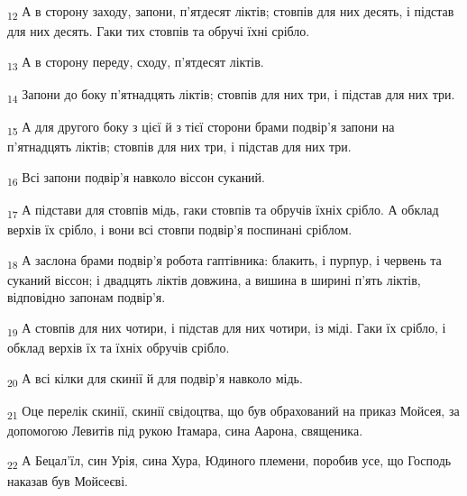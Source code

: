 \begin{tcolorbox}
\textsubscript{12} А в сторону заходу, запони, п'ятдесят ліктів; стовпів для них десять, і підстав для них десять. Гаки тих стовпів та обручі їхні срібло.
\end{tcolorbox}
\begin{tcolorbox}
\textsubscript{13} А в сторону переду, сходу, п'ятдесят ліктів.
\end{tcolorbox}
\begin{tcolorbox}
\textsubscript{14} Запони до боку п'ятнадцять ліктів; стовпів для них три, і підстав для них три.
\end{tcolorbox}
\begin{tcolorbox}
\textsubscript{15} А для другого боку з цієї й з тієї сторони брами подвір'я запони на п'ятнадцять ліктів; стовпів для них три, і підстав для них три.
\end{tcolorbox}
\begin{tcolorbox}
\textsubscript{16} Всі запони подвір'я навколо віссон суканий.
\end{tcolorbox}
\begin{tcolorbox}
\textsubscript{17} А підстави для стовпів мідь, гаки стовпів та обручів їхніх срібло. А обклад верхів їх срібло, і вони всі стовпи подвір'я поспинані сріблом.
\end{tcolorbox}
\begin{tcolorbox}
\textsubscript{18} А заслона брами подвір'я робота гаптівника: блакить, і пурпур, і червень та суканий віссон; і двадцять ліктів довжина, а вишина в ширині п'ять ліктів, відповідно запонам подвір'я.
\end{tcolorbox}
\begin{tcolorbox}
\textsubscript{19} А стовпів для них чотири, і підстав для них чотири, із міді. Гаки їх срібло, і обклад верхів їх та їхніх обручів срібло.
\end{tcolorbox}
\begin{tcolorbox}
\textsubscript{20} А всі кілки для скинії й для подвір'я навколо мідь.
\end{tcolorbox}
\begin{tcolorbox}
\textsubscript{21} Оце перелік скинії, скинії свідоцтва, що був обрахований на приказ Мойсея, за допомогою Левитів під рукою Ітамара, сина Аарона, священика.
\end{tcolorbox}
\begin{tcolorbox}
\textsubscript{22} А Бецал'їл, син Урія, сина Хура, Юдиного племени, поробив усе, що Господь наказав був Мойсеєві.
\end{tcolorbox}
